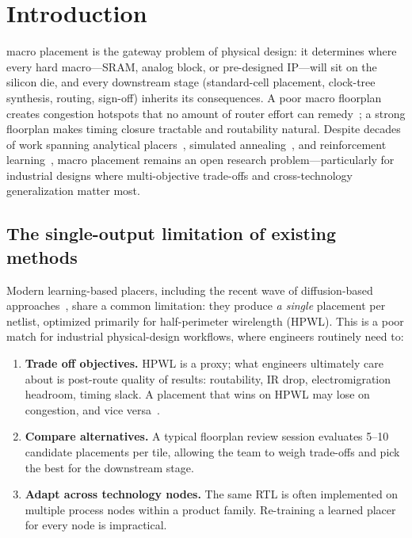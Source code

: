
\section{Introduction}
\label{sec:intro}

 macro placement is the gateway problem of physical design: it determines where every hard macro—SRAM, analog block, or pre-designed IP—will sit on the silicon die, and every downstream stage (standard-cell placement, clock-tree synthesis, routing, sign-off) inherits its consequences. A poor macro floorplan creates congestion hotspots that no amount of router effort can remedy~\cite{kahng2022survey}; a strong floorplan makes timing closure tractable and routability natural. Despite decades of work spanning analytical placers~\cite{lin2019dreamplace, autodmp}, simulated annealing~\cite{hier-rtlmp, tritonmacroplace}, and reinforcement learning~\cite{mirhoseini2021nature}, macro placement remains an open research problem—particularly for industrial designs where multi-objective trade-offs and cross-technology generalization matter most.

\subsection{The single-output limitation of existing methods}

Modern learning-based placers, including the recent wave of diffusion-based approaches~\cite{lee2024chipdiffusion, fang2025graphdiffusion, trung2025diffplace, yoon2025geometric}, share a common limitation: they produce \emph{a single} placement per netlist, optimized primarily for half-perimeter wirelength (HPWL). This is a poor match for industrial physical-design workflows, where engineers routinely need to:

\begin{enumerate}
\item \textbf{Trade off objectives.} HPWL is a proxy; what engineers ultimately care about is post-route quality of results: routability, IR drop, electromigration headroom, timing slack. A placement that wins on HPWL may lose on congestion, and vice versa~\cite{cheng2024rethinking}.
\item \textbf{Compare alternatives.} A typical floorplan review session evaluates 5--10 candidate placements per tile, allowing the team to weigh trade-offs and pick the best for the downstream stage.
\item \textbf{Adapt across technology nodes.} The same RTL is often implemented on multiple process nodes within a product family. Re-training a learned placer for every node is impractical.
\end{enumerate}

